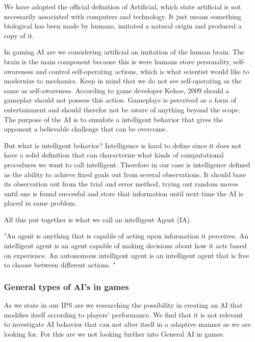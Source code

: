We have adopted the official definition of Artificial, which state artificial is not necessarily associated with computers and technology. \cite {artificial2014} It just means something biological has been made by humans, imitated a natural origin and produced a copy of it.

In gaming AI are we considering artificial an imitation of the human brain. The brain is the main component because this is were humans store personality, self-awareness and control self-operating actions, which is what scientist would like to modernize to mechanics. \cite {something}
Keep in mind that we do not see self-operating as the same as self-awareness. According to game developer Kehoe, 2009 should a gameplay should not possess this action. \cite {Kehoe2009}Gameplays is perceived as a form of entertainment and should therefor not be aware of anything beyond the scope. The purpose of the AI is to simulate a intelligent behavior that gives the opponent a believable challenge that can be overcome.

But what is intelligent behavior? Intelligence is hard to define since it does not have a solid definition that can characterize what kinds of computational procedures we want to call intelligent.  \cite {McCarthy2007} Therefore in our case is intelligence defined as the ability to achieve fixed goals out from several observations.
It should base its observation out from the trial and error method, trying out random moves until one is found succesful and store that information until next time the AI is placed in same problem. 

All this put together is what we call an intelligent Agent (IA).

"An agent is anything that is capable of acting upon information it perceives. An intelligent agent is an agent capable of making decisions about how it acts based on experience. An autonomous intelligent agent is an intelligent agent that is free to choose between different actions. "  \cite {mills2005} 



\subsubsection{General types of AI's in games}

As we state in our IPS are we researching the possibility in creating an AI that modifies itself according to players' performance. We find that it is not relevant to investigate AI behavior that can not alter itself in a adaptive manner as we are looking for. For this are we not looking further into General AI in games.  


